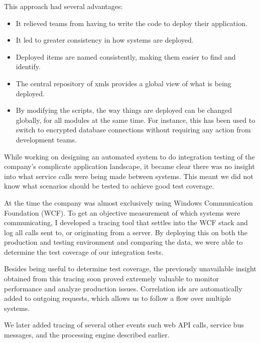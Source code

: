 \documentclass[10pt,a4paper]{../altacv}
\begin{document}
\begin{fullwidth}
\medskip\medskip

This approach had several advantages:

\medskip

\begin{itemize}
\item\small It relieved teams from having to write the code to deploy their application.
\item\small It led to greater consistency in how systems are deployed.
\item\small Deployed items are named consistently, making them easier to find and identify.
\item\small The central repository of xmls provides a global view of what is being deployed.
\item\small By modifying the scripts, the way things are deployed can be changed globally, for all modules at the same time. For instance, this has been used to switch to encrypted database connections without requiring any action from development teams.
\end{itemize}

\bigskip\bigskip

While working on designing an automated system to do integration testing of the company’s complicate application landscape, it became clear there was no insight into what service calls were being made between systems. This meant we did not know what scenarios should be tested to achieve good test coverage.

\medskip\medskip

At the time the company was almost exclusively using Windows Communication Foundation (WCF). To get an objective measurement of which systems were communicating, I developed a tracing tool that settles into the WCF stack and log all calls sent to, or originating from a server. By deploying this on both the production and testing environment and comparing the data, we were able to determine the test coverage of our integration tests.

\medskip\medskip

Besides being useful to determine test coverage, the previously unavailable insight obtained from this tracing soon proved extremely valuable to monitor performance and analyze production issues. Correlation ids are automatically added to outgoing requests, which allows us to follow a flow over multiple systems.

\medskip\medskip

We later added tracing of several other events such web API calls, service bus messages, and the processing engine described earlier. 


\end{fullwidth}
\end{document}
